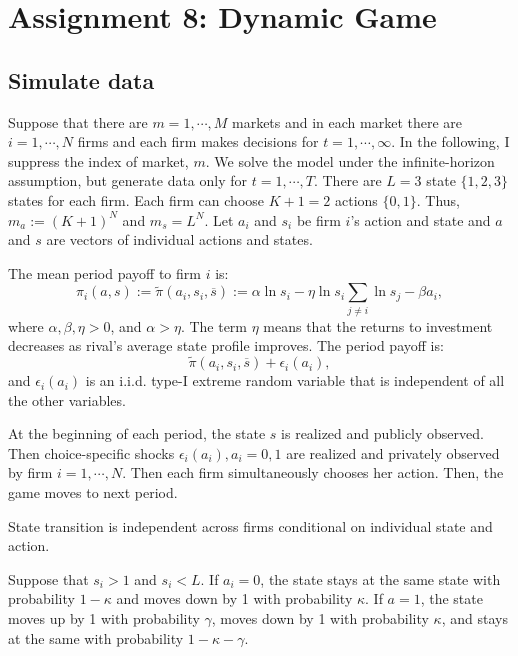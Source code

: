 \documentclass[
]{book}
\begin{document}
\hypertarget{assignment8}{%
\chapter{Assignment 8: Dynamic Game}\label{assignment8}}

\hypertarget{simulate-data-7}{%
\section{Simulate data}\label{simulate-data-7}}

Suppose that there are \(m = 1, \cdots, M\) markets and in each market there are \(i = 1, \cdots, N\) firms and each firm makes decisions for \(t = 1, \cdots, \infty\). In the following, I suppress the index of market, \(m\). We solve the model under the infinite-horizon assumption, but generate data only for \(t = 1, \cdots, T\). There are \(L = 3\) state \(\{1, 2, 3\}\) states for each firm. Each firm can choose \(K + 1 = 2\) actions \(\{0, 1\}\). Thus, \(m_a := (K + 1)^N\) and \(m_s = L^N\). Let \(a_i\) and \(s_i\) be firm \(i\)'s action and state and \(a\) and \(s\) are vectors of individual actions and states.

The mean period payoff to firm \(i\) is:
\[
\pi_i(a, s) := \tilde{\pi}(a_i, s_i, \overline{s}) :=  \alpha \ln s_i - \eta \ln s_i \sum_{j \neq i} \ln s_j - \beta a_i,
\]
where \(\alpha, \beta, \eta> 0\), and \(\alpha > \eta\). The term \(\eta\) means that the returns to investment decreases as rival's average state profile improves. The period payoff is:
\[
\tilde{\pi}(a_i, s_i, \overline{s})+ \epsilon_i(a_i),
\]
and \(\epsilon_i(a_i)\) is an i.i.d. type-I extreme random variable that is independent of all the other variables.

At the beginning of each period, the state \(s\) is realized and publicly observed. Then choice-specific shocks \(\epsilon_i(a_i), a_i = 0, 1\) are realized and privately observed by firm \(i = 1, \cdots, N\). Then each firm simultaneously chooses her action. Then, the game moves to next period.

State transition is independent across firms conditional on individual state and action.

Suppose that \(s_i > 1\) and \(s_i < L\). If \(a_i = 0\), the state stays at the same state with probability \(1 - \kappa\) and moves down by 1 with probability \(\kappa\). If \(a = 1\), the state moves up by 1 with probability \(\gamma\), moves down by 1 with probability \(\kappa\), and stays at the same with probability \(1 - \kappa - \gamma\).
\end{document}
